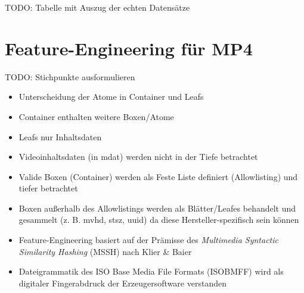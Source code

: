 \begin{table}[htbp]
    \centering
    \caption{TODO: Beispieldatensätze}
    \label{tab:testdaten_auszug}
\end{table}

TODO: Tabelle mit Auszug der echten Datensätze



\newpage
\section{Feature-Engineering für MP4}

TODO: Stichpunkte ausformulieren

\begin{itemize}
    \item Unterscheidung der Atome in Container und Leafs
    \item Container enthalten weitere Boxen/Atome
    \item Leafs nur Inhaltsdaten
    \item Videoinhaltsdaten (in mdat) werden nicht in der Tiefe betrachtet
    \item Valide Boxen (Container) werden als Feste Liste definiert (Allowlisting) und tiefer betrachtet
    \item Boxen außerhalb des Allowlistings werden als Blätter/Leafes behandelt und gesammelt (z. B. mvhd, stsz, uuid) da diese Hersteller-spezifisch sein können
    \item Feature-Engineering basiert auf der Prämisse des \textit{Multimedia Syntactic Similarity Hashing} (MSSH) nach Klier \& Baier \cite{klier_media_2025}
    \item Dateigrammatik des ISO Base Media File Formats (ISOBMFF) wird als digitaler Fingerabdruck der Erzeugersoftware verstanden 
\end{itemize}


